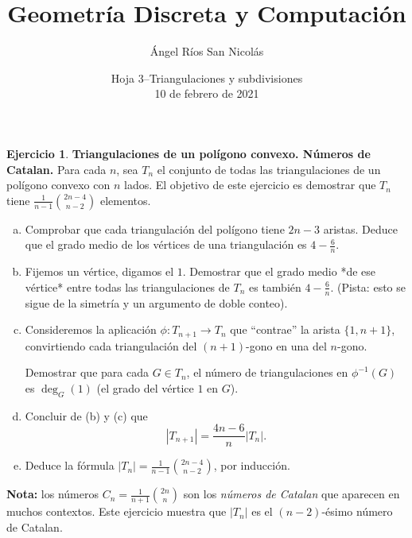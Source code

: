 \documentclass[10pt]{article}
\author{Ángel Ríos San Nicolás}
\title{Geometría Discreta y Computación}
\date{Hoja 3--Triangulaciones y subdivisiones\\ 10 de febrero de 2021}
\theoremstyle{definition}
\newtheorem{ejer}{Ejercicio}
\begin{document}
\maketitle

\begin{ejer} {\bf Triangulaciones de un pol\'igono convexo. N\'umeros de Catalan.} 
Para cada $n$, sea $T_n$ el conjunto de todas las triangulaciones de un pol\'igono convexo con $n$ lados. 
El objetivo de este ejercicio es demostrar que 
 $T_n$ tiene  $\frac{1}{n-1}\binom{2n-4}{n-2}$ elementos. 
 
\begin{enumerate}[(a)]
\item Comprobar que cada triangulaci\'on del polígono tiene $2n-3$ aristas. %
Deduce que el grado medio de los v\'ertices de una triangulaci\'on es 
$4-\frac{6}{n}$.

\item Fijemos un v\'ertice, digamos el $1$. Demostrar que el grado medio *de ese v\'ertice* entre todas las triangulaciones de $T_n$ es tambi\'en
 $4-\frac{6}{n}$. (Pista: esto se sigue de la simetr\'ia y un argumento de doble conteo).
 
\item Consideremos la aplicaci\'on  $\phi: T_{n+1}\to T_{n}$ que ``contrae'' la arista $\{1,n+1\}$, convirtiendo cada triangulaci\'on del 
$(n+1)$-gono en una del $n$-gono.%

Demostrar que para cada $G\in T_{n}$, el n\'umero de triangulaciones en $\phi^{-1}(G)$ es $\deg_G(1)$ (el grado del v\'ertice $1$ en $G$).

\item Concluir de (b) y (c) que
\[
|T_{n+1}| = \frac{4n-6}{n} |T_n|.
\]
\item Deduce la f\'ormula $|T_n|=\frac{1}{n-1}\binom{2n-4}{n-2}$, por inducci\'on.
\end{enumerate}


{\bf Nota:} los n\'umeros $C_n=\frac{1}{n+1}\binom{2n}{n}$ son los  \emph{n\'umeros de Catalan} que aparecen en muchos contextos.
Este ejercicio muestra que $|T_n|$ es el $(n-2)$-\'esimo n\'umero de Catalan.
\end{ejer}
\end{document}
